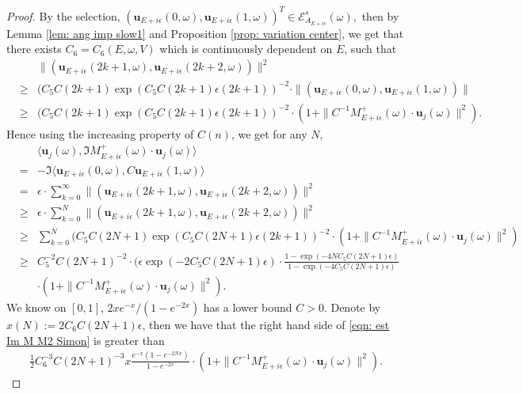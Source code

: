\documentclass[11pt]{amsart}
\theoremstyle{remark}
\theoremstyle{definition}
\newcommand{\E}{{\mathbf E}}
\def \E{\mathcal{E}}
\begin{document}
\begin{proof}
By the selection, 
$\left(\mathbf{u}_{E+i\epsilon}(0,\omega), \mathbf{u}_{E+i\epsilon}(1,\omega)\right)^{T} \in \E^s_{A_{E+i\epsilon}}(\omega),$
then by 
Lemma \ref{lem: ang imp slow1} and  Proposition \ref{prop: variation center}, we get that there exists $C_6=C_6(E,\omega,V)$ which is continuously dependent on $E$, such that 
\begin{eqnarray*}
&&\|(\mathbf{u}_{E+i\epsilon}(2k+1,\omega), \mathbf{u}_{E+i\epsilon}(2k+2,\omega))\|^2\\
&\geq& (C_5C(2k+1)\exp(C_5C(2k+1)\epsilon (2k+1))^{-2}\cdot \|(\mathbf{u}_{E+i\epsilon}(0,\omega), \mathbf{u}_{E+i\epsilon}(1,\omega))\|  \\
&\geq &(C_5C(2k+1)\exp(C_5C(2k+1)\epsilon (2k+1))^{-2} \cdot (1+\|C^{-1}M_{E+i\epsilon}^+(\omega)\cdot \mathbf{u}_j(\omega)\|^2).
\end{eqnarray*}
Hence using the increasing property of $C(n)$, we get for any $N$, 
\begin{eqnarray}
&&\langle\mathbf{u}_j(\omega), \Im M_{E+i\epsilon}^+(\omega)\cdot \mathbf{u}_j(\omega)\rangle \nonumber \\
&=&-\Im  \langle\mathbf{u}_{E+i\epsilon}(0,\omega),  C\mathbf{u}_{E+i\epsilon}(1,\omega)\rangle \nonumber \\
&=&\epsilon\cdot \sum_{k=0}^\infty \|(\mathbf{u}_{E+i\epsilon}(2k+1,\omega), \mathbf{u}_{E+i\epsilon}(2k+2,\omega))\|^2  \nonumber \\
&\geq &\epsilon\cdot \sum_{k=0}^N \|(\mathbf{u}_{E+i\epsilon}(2k+1,\omega), \mathbf{u}_{E+i\epsilon}(2k+2,\omega))\|^2 \nonumber\\
&\geq & \sum_{k=0}^N (C_5C(2N+1)\exp(C_5C(2N+1)\epsilon (2k+1))^{-2} \cdot (1+\|C^{-1}M_{E+i\epsilon}^+(\omega)\cdot \mathbf{u}_j(\omega)\|^2)\nonumber\\
&\geq & C_5^{-2}C(2N+1)^{-2}\cdot(\epsilon\exp(-2C_5C(2N+1)\epsilon)\cdot \frac{1-\exp(-4N C_5 C(2N+1)\epsilon)}{1-\exp(-4C_5C(2N+1)\epsilon)}\nonumber\\ && \cdot(1+\|C^{-1}M_{E+i\epsilon}^+(\omega)\cdot \mathbf{u}_j(\omega)\|^2). \label{eqn: est Im M M2 Simon}
\end{eqnarray}
 We know on $[0,1]$, $2xe^{-x}/(1-e^{-2x})$ has a lower bound $C>0$. Denote by $x(N):=2C_6C(2N+1)\epsilon$, then we have that the right hand side of \eqref{eqn: est Im M M2 Simon} is greater than 
\begin{eqnarray*}
\frac{1}{2}  C_6^{-3}C(2N+1)^{-3} x\frac{e^{-x}(1-e^{-2Nx})}{1-e^{-2x}} \cdot (1+\|C^{-1}M_{E+i\epsilon}^+(\omega)\cdot \mathbf{u}_j(\omega)\|^2) .

\end{eqnarray*}
\end{proof}
\end{document}
